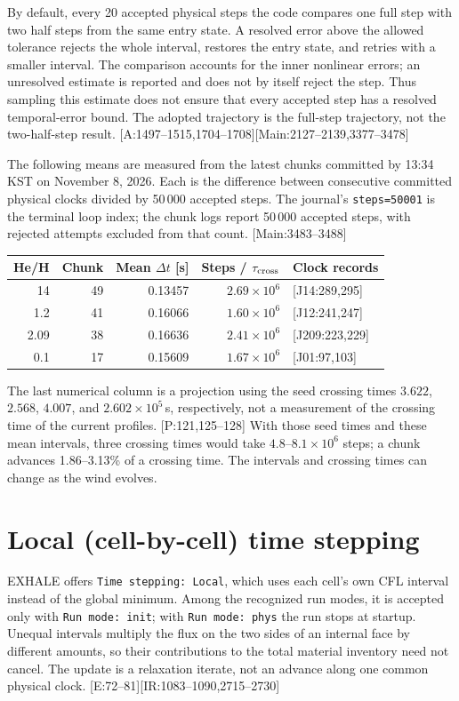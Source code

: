 \documentclass[english,a4paper]{my_memo}
\newcommand{\ev}[2]{\textnormal{\small[#1:#2]}}
\begin{document}
By default, every 20 accepted physical steps the code compares one full step
with two half steps from the same entry state. A resolved error above the
allowed tolerance rejects the whole interval, restores the entry state, and
retries with a smaller interval. The comparison accounts for the inner
nonlinear errors; an unresolved estimate is reported and does not by itself
reject the step. Thus sampling this estimate does not ensure that every
accepted step has a resolved temporal-error bound. The adopted trajectory is
the full-step trajectory, not the two-half-step result.
\ev{A}{1497--1515,1704--1708}\ev{Main}{2127--2139,3377--3478}

The following means are measured from the latest chunks committed by
13:34 KST on November 8, 2026. Each is the difference between consecutive
committed physical clocks divided by 50\,000 accepted steps. The journal's
\texttt{steps=50001} is the terminal loop index; the chunk logs report
50\,000 accepted steps, with rejected attempts excluded from that count.
\ev{Main}{3483--3488}
\begin{center}
\begin{tabular}{rrrrl}
\toprule
He/H & Chunk & Mean $\Delta t$ [s] & Steps / $\tau_{\rm cross}$ & Clock records \\
\midrule
14   & 49 & 0.13457 & $2.69\times10^6$ & \ev{J14}{289,295} \\
1.2  & 41 & 0.16066 & $1.60\times10^6$ & \ev{J12}{241,247} \\
2.09 & 38 & 0.16636 & $2.41\times10^6$ & \ev{J209}{223,229} \\
0.1  & 17 & 0.15609 & $1.67\times10^6$ & \ev{J01}{97,103} \\
\bottomrule
\end{tabular}
\end{center}
The last numerical column is a projection using the seed crossing times
$3.622$, $2.568$, $4.007$, and $2.602\times10^5$\,s, respectively,
not a measurement of the crossing time of the current profiles.
\ev{P}{121,125--128} With those seed times and these mean intervals, three
crossing times would take $4.8$--$8.1\times10^6$ steps; a chunk advances
1.86--3.13\% of a crossing time. The intervals and crossing times can change
as the wind evolves.

\section{Local (cell-by-cell) time stepping}

EXHALE offers \texttt{Time stepping: Local}, which uses each cell's own
CFL interval instead of the global minimum. Among the recognized run modes,
it is accepted only with \texttt{Run mode: init}; with
\texttt{Run mode: phys} the run stops at startup. Unequal intervals multiply
the flux on the two sides of an internal face by different amounts, so their
contributions to the total material inventory need not cancel. The update is
a relaxation iterate, not an advance along one common physical clock.
\ev{E}{72--81}\ev{IR}{1083--1090,2715--2730}
\end{document}
